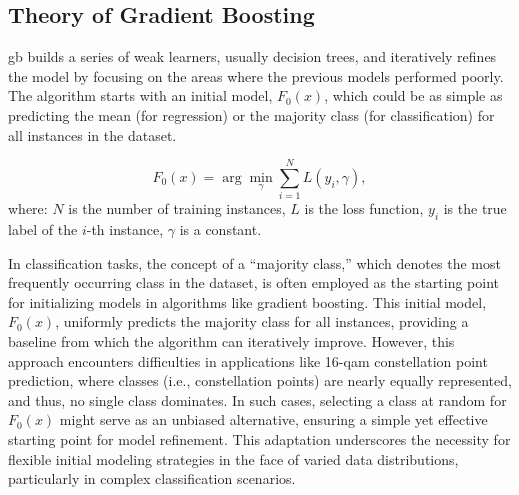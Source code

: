 \subsection{Theory of Gradient Boosting}

\acrfull{gb} builds a series of weak learners, usually decision trees, and iteratively refines the model by focusing on the areas where the previous models performed poorly. 
The algorithm starts with an initial model, \( F_0(x) \), which could be as simple as predicting the mean (for regression) or the majority class (for classification) for all instances in the dataset.

\begin{equation}
    F_0(x) = \arg\min_{\gamma} \sum_{i=1}^N L(y_i, \gamma) {,}
\end{equation}
where: \( N \) is the number of training instances,
\( L \) is the loss function,
\( y_i \) is the true label of the \( i \)-th instance,
\( \gamma \) is a constant.

In classification tasks, the concept of a ``majority class,'' which denotes the most frequently occurring class in the dataset, is often employed as the starting point for initializing models in algorithms like gradient boosting. This initial model, \(F_0(x)\), uniformly predicts the majority class for all instances, providing a baseline from which the algorithm can iteratively improve. However, this approach encounters difficulties in applications like 16-\acrshort{qam} constellation point prediction, where classes (i.e., constellation points) are nearly equally represented, and thus, no single class dominates. In such cases, selecting a class at random for \(F_0(x)\) might serve as an unbiased alternative, ensuring a simple yet effective starting point for model refinement. This adaptation underscores the necessity for flexible initial modeling strategies in the face of varied data distributions, particularly in complex classification scenarios.

